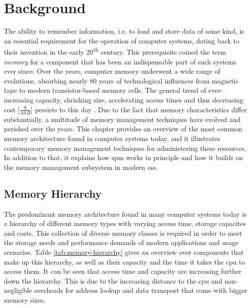 \chapter{Background}
\label{chap:background}


The ability to remember information, i.e. to load and store data of some kind, is an essential requirement for the operation of computer systems, dating back to their invention in the early 20\textsuperscript{th} century.
This prerequisite coined the term \emph{memory} for a component that has been an indispensable part of such systems ever since.
Over the years, computer memory underwent a wide range of evolutions, absorbing nearly 80 years of technological influences from magnetic tape to modern transistor-based memory cells.
The general trend of ever-increasing capacity, shrinking size, accelerating access times and thus decreasing cost [\emph{$\frac{\$}{MiB}$}] persists to this day \cite{memory-price}.
Due to the fact that memory characteristics differ substantially, a multitude of memory management techniques have evolved and perished over the years.
This chapter provides an overview of the most common memory architecture found in computer systems today, and it illustrates contemporary memory management techniques for administering these resources.
In addition to that, it explains how \ac{spm} works in principle and how it builds on the memory management subsystem in modern \acp{os}.

\section{Memory Hierarchy}
\label{sec:memory-hierarchy}

The predominant memory architecture found in many computer systems today is a hierarchy of different memory types with varying access time, storage capacites and costs.
This collection of diverse memory classes is required in order to meet the storage needs and performance demands of modern applications and usage scenarios.
Table \ref{tab:memory-hierarchy} gives an overview over components that make up this hierarchy, as well as their capacity and the time it takes the \ac{cpu} to access them.
It can be seen that access time and capacity are increasing further down the hierarchy.
This is due to the increasing distance to the \ac{cpu} and non-negligible overheads for address lookup and data transport that come with bigger memory sizes.


